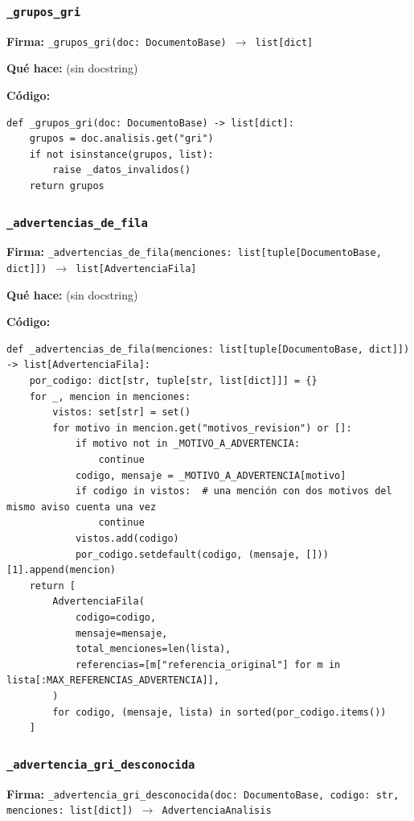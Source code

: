\documentclass[11pt,a4paper]{article}
\begin{document}
\subsubsection*{\texttt{\_grupos\_gri}}
\textbf{Firma:} \texttt{\_grupos\_gri(doc: DocumentoBase) $\rightarrow$ list[dict]}

\textbf{Qué hace:} (sin docstring)

\textbf{Código:}
\begin{lstlisting}
def _grupos_gri(doc: DocumentoBase) -> list[dict]:
    grupos = doc.analisis.get("gri")
    if not isinstance(grupos, list):
        raise _datos_invalidos()
    return grupos
\end{lstlisting}

\subsubsection*{\texttt{\_advertencias\_de\_fila}}
\textbf{Firma:} \texttt{\_advertencias\_de\_fila(menciones: list[tuple[DocumentoBase, dict]]) $\rightarrow$ list[AdvertenciaFila]}

\textbf{Qué hace:} (sin docstring)

\textbf{Código:}
\begin{lstlisting}
def _advertencias_de_fila(menciones: list[tuple[DocumentoBase, dict]]) -> list[AdvertenciaFila]:
    por_codigo: dict[str, tuple[str, list[dict]]] = {}
    for _, mencion in menciones:
        vistos: set[str] = set()
        for motivo in mencion.get("motivos_revision") or []:
            if motivo not in _MOTIVO_A_ADVERTENCIA:
                continue
            codigo, mensaje = _MOTIVO_A_ADVERTENCIA[motivo]
            if codigo in vistos:  # una mención con dos motivos del mismo aviso cuenta una vez
                continue
            vistos.add(codigo)
            por_codigo.setdefault(codigo, (mensaje, []))[1].append(mencion)
    return [
        AdvertenciaFila(
            codigo=codigo,
            mensaje=mensaje,
            total_menciones=len(lista),
            referencias=[m["referencia_original"] for m in lista[:MAX_REFERENCIAS_ADVERTENCIA]],
        )
        for codigo, (mensaje, lista) in sorted(por_codigo.items())
    ]
\end{lstlisting}

\subsubsection*{\texttt{\_advertencia\_gri\_desconocida}}
\textbf{Firma:} \texttt{\_advertencia\_gri\_desconocida(doc: DocumentoBase, codigo: str, menciones: list[dict]) $\rightarrow$ AdvertenciaAnalisis}
\end{document}
